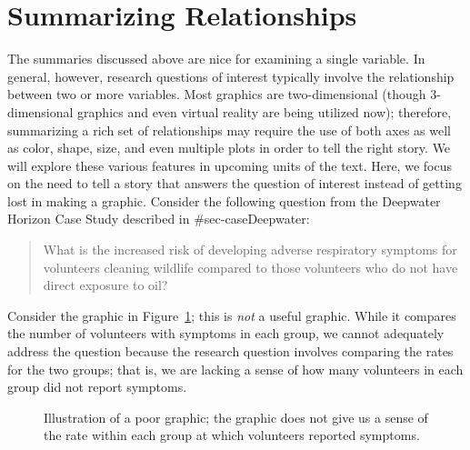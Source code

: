 \documentclass[
  letterpaper,
  DIV=11,
  numbers=noendperiod]{scrreprt}
\theoremstyle{definition}
\theoremstyle{definition}
\theoremstyle{plain}
\theoremstyle{remark}
\begin{document}
\section{Summarizing Relationships}\label{summarizing-relationships}

The summaries discussed above are nice for examining a single variable.
In general, however, research questions of interest typically involve
the relationship between two or more variables. Most graphics are
two-dimensional (though 3-dimensional graphics and even virtual reality
are being utilized now); therefore, summarizing a rich set of
relationships may require the use of both axes as well as color, shape,
size, and even multiple plots in order to tell the right story. We will
explore these various features in upcoming units of the text. Here, we
focus on the need to tell a story that answers the question of interest
instead of getting lost in making a graphic. Consider the following
question from the Deepwater Horizon Case Study described in
\#sec-caseDeepwater:

\begin{quote}
What is the increased risk of developing adverse respiratory symptoms
for volunteers cleaning wildlife compared to those volunteers who do not
have direct exposure to oil?
\end{quote}

Consider the graphic in Figure~\ref{fig-summaries-bad-barchart}; this is
\emph{not} a useful graphic. While it compares the number of volunteers
with symptoms in each group, we cannot adequately address the question
because the research question involves comparing the rates for the two
groups; that is, we are lacking a sense of how many volunteers in each
group did not report symptoms.

\begin{figure}


\caption{\label{fig-summaries-bad-barchart}Illustration of a poor
graphic; the graphic does not give us a sense of the rate within each
group at which volunteers reported symptoms.}

\end{figure}%
\end{document}
